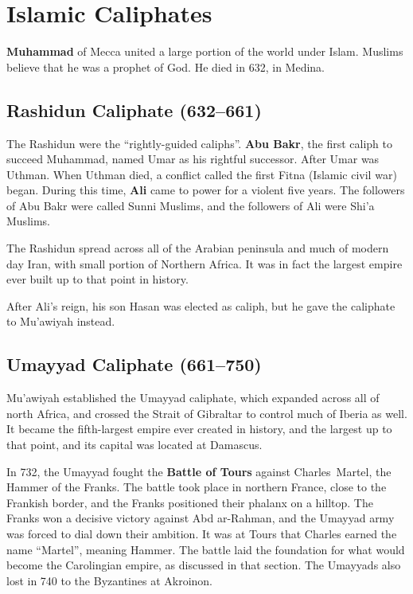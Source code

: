 \section{Islamic Caliphates}

\textbf{Muhammad} of Mecca united a large portion of the world under Islam.
Muslims believe that he was a prophet of God.
He died in 632, in Medina.

\subsection*{Rashidun Caliphate (632--661)}

The Rashidun were the ``rightly-guided caliphs''.
\textbf{Abu Bakr}, the first caliph to succeed Muhammad, named Umar as his rightful successor.
After Umar was Uthman.
When Uthman died, a conflict called the first Fitna (Islamic civil war) began.
During this time, \textbf{Ali} came to power for a violent five years.
The followers of Abu Bakr were called Sunni Muslims, and the followers of Ali were Shi'a Muslims.

The Rashidun spread across all of the Arabian peninsula and much of modern day Iran,
with small portion of Northern Africa.
It was in fact the largest empire ever built up to that point in history.

After Ali's reign, his son Hasan was elected as caliph, but he gave the caliphate to Mu'awiyah instead.

\subsection*{Umayyad Caliphate (661--750)}

Mu'awiyah established the Umayyad caliphate, which expanded across all of north Africa,
and crossed the Strait of Gibraltar to control much of Iberia as well.
It became the fifth-largest empire ever created in history, and the largest up to that point,
and its capital was located at Damascus.

In 732, the Umayyad fought the \textbf{Battle of Tours} against Charles~Martel, the Hammer of the Franks.
The battle took place in northern France, close to the Frankish border,
and the Franks positioned their phalanx on a hilltop.
The Franks won a decisive victory against Abd ar-Rahman,
and the Umayyad army was forced to dial down their ambition.
It was at Tours that Charles earned the name ``Martel'', meaning Hammer.
The battle laid the foundation for what would become the Carolingian empire, as discussed in that section.
The Umayyads also lost in 740 to the Byzantines at Akroinon.

